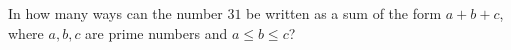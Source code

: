 In how many ways can the number $31$ be written as a sum of the form $a+b+c$, where $a, b, c$ are prime numbers and $a \leqslant b \leqslant c$?
